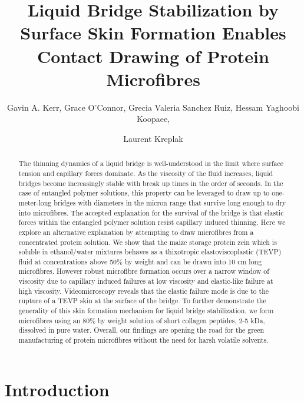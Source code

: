\documentclass[lineno]{JFM-FLM_Au}
\title{Liquid Bridge Stabilization by Surface Skin Formation Enables Contact Drawing of Protein Microfibres}
\author{
	Gavin A. Kerr\aff{1}, 
	Grace O'Connor\aff{1},
	Grecia Valeria Sanchez Ruiz\aff{1},
	Hessam Yaghoobi Koopaee\aff{1},
	\and Laurent Kreplak\aff{1}
}
\affiliation{
	\aff{1}Dalhousie University, Department of Physics and Atmospheric Science, 6385 South St, Halifax, NS B3H 4J4, Canada
}
\begin{document}
\maketitle

\begin{abstract}
The thinning dynamics of a liquid bridge is well-understood in the limit where surface tension and capillary forces dominate. As the viscosity of the fluid increases, liquid bridges become increasingly stable with break up times in the order of seconds. In the case of entangled polymer solutions, this property can be leveraged to draw up to one-meter-long bridges with diameters in the micron range that survive long enough to dry into microfibres. The accepted explanation for the survival of the bridge is that elastic forces within the entangled polymer solution resist capillary induced thinning. Here we explore an alternative explanation by attempting to draw microfibres from a concentrated protein solution. We show that the maize storage protein zein which is soluble in ethanol/water mixtures behaves as a thixotropic elastoviscoplastic (TEVP) fluid at concentrations above 50\% by weight and can be drawn into 10 cm long microfibres.  However robust microfibre formation occurs over a narrow window of viscosity due to capillary induced failures at low viscosity and elastic-like failure at high viscosity. Videomicroscopy reveals that the elastic failure mode is due to the rupture of a TEVP skin at the surface of the bridge. To further demonstrate the generality of this skin formation mechanism for liquid bridge stabilization, we form microfibres using an 80\% by weight solution of short collagen peptides, 2-5 kDa, dissolved in pure water. Overall, our findings are opening the road for the green manufacturing of protein microfibres without the need for harsh volatile solvents.
\end{abstract}



\section{Introduction}
\end{document}
